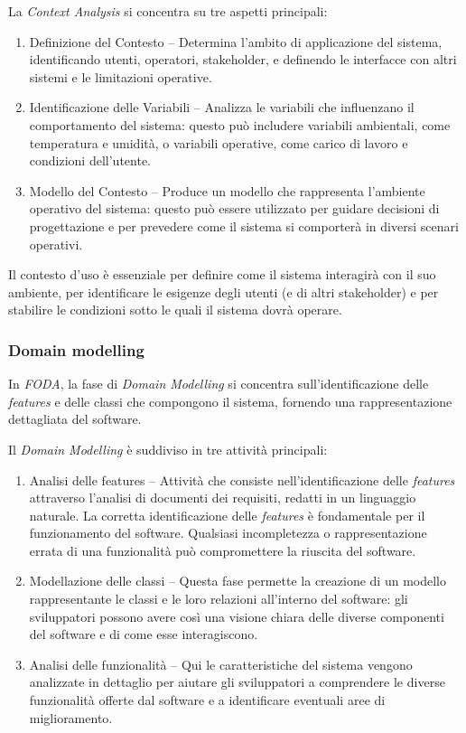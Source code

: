\documentclass[12pt]{report}
\newcommand{\foda}{\textsl{FODA}\xspace}
\begin{document}
La \textit{Context Analysis} si concentra su tre aspetti principali:

\begin{enumerate}
\item \textsf{Definizione del Contesto} -- Determina l'ambito di applicazione del sistema, identificando utenti, operatori, stakeholder, e definendo le interfacce con altri sistemi e le limitazioni operative.
\item \textsf{Identificazione delle Variabili} -- Analizza le variabili che influenzano il comportamento del sistema: questo può includere variabili ambientali, come temperatura e umidità, o variabili operative, come carico di lavoro e condizioni dell'utente.
\item \textsf{Modello del Contesto} -- Produce un modello che rappresenta l'ambiente operativo del sistema: questo può essere utilizzato per guidare decisioni di progettazione e per prevedere come il sistema si comporterà in diversi scenari operativi.
\end{enumerate}

Il contesto d'uso è essenziale per definire come il sistema interagirà con il suo ambiente, per identificare le esigenze degli utenti (e di altri stakeholder) e per stabilire le condizioni sotto le quali il sistema dovrà operare.


\subsubsection{Domain modelling}
In \foda, la fase di \textit{Domain Modelling} si concentra sull'identificazione delle \textit{features} e delle classi che compongono il sistema, fornendo una rappresentazione dettagliata del software.

Il \textit{Domain Modelling} è suddiviso in tre attività principali:

\begin{enumerate}
\item \textsf{Analisi delle features} -- Attività che consiste nell'identificazione delle \textit{features} attraverso l'analisi di documenti dei requisiti, redatti in un linguaggio naturale. La corretta identificazione delle \textit{features} è fondamentale per il funzionamento del software. Qualsiasi incompletezza o rappresentazione errata di una funzionalità può compromettere la riuscita del software.
\item \textsf{Modellazione delle classi} -- Questa fase permette la creazione di un modello rappresentante le classi e le loro relazioni all'interno del software: gli sviluppatori possono avere così una visione chiara delle diverse componenti del software e di come esse interagiscono.
\item \textsf{Analisi delle funzionalità} -- Qui le caratteristiche del sistema vengono analizzate in dettaglio per aiutare gli sviluppatori a comprendere le diverse funzionalità offerte dal software e a identificare eventuali aree di miglioramento.
\end{enumerate}
\end{document}
